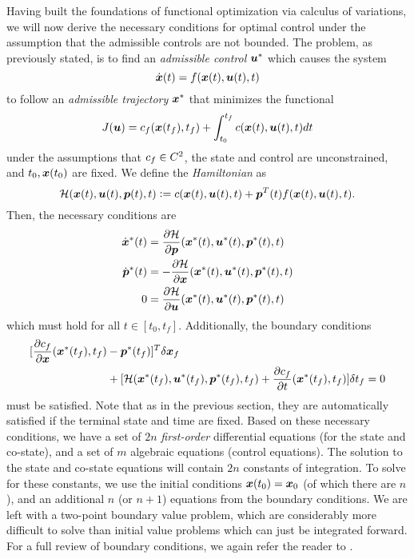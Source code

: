 Having built the foundations of functional optimization via calculus of variations, we will now derive the necessary conditions for optimal control under the assumption that the admissible controls are not bounded. The problem, as previously stated, is to find an \textit{admissible control} $\bm{u}^*$ which causes the system 
\begin{equation}
    \dot{\bm{x}}(t) = f(\bm{x}(t),\bm{u}(t),t)
\end{equation}
to follow an \textit{admissible trajectory} $\bm{x}^*$ that minimizes the functional
\begin{equation}
    J(\bm{u}) = c_f(\bm{x}(t_f),t_f) + \int_{t_0}^{t_f} c(\bm{x}(t),\bm{u}(t),t) dt
\end{equation}
under the assumptions that $c_f \in C^2$, the state and control are unconstrained, and $t_0, \bm{x}(t_0)$ are fixed. We define the \textit{Hamiltonian} as
\begin{equation}
    \mathcal{H}(\bm{x}(t),\bm{u}(t),\bm{p}(t),t) \vcentcolon= c(\bm{x}(t),\bm{u}(t),t) + \bm{p}^T(t) f(\bm{x}(t),\bm{u}(t),t).
\end{equation}
Then, the necessary conditions are 
\begin{align}
\label{eq:nec_ham_conds1}
    \dot{\bm{x}}^*(t) &= \frac{\partial \mathcal{H}}{\partial \bm{p}}(\bm{x}^*(t),\bm{u}^*(t),\bm{p}^*(t),t)\\
    \dot{\bm{p}}^*(t) &= -\frac{\partial \mathcal{H}}{\partial \bm{x}}(\bm{x}^*(t),\bm{u}^*(t),\bm{p}^*(t),t)\\
    0 &= \frac{\partial \mathcal{H}}{\partial \bm{u}}(\bm{x}^*(t),\bm{u}^*(t),\bm{p}^*(t),t)
    \label{eq:nec_ham_conds3}
\end{align}
which must hold for all $t \in [t_0,t_f]$. Additionally, the boundary conditions 
\begin{align}
\label{eq:ham_bcs}
    [\frac{\partial c_f}{\partial \bm{x}}(\bm{x}^*(t_f),t_f)& - \bm{p}^*(t_f)]^T \delta \bm{x}_f\\
    & + [ \mathcal{H}(\bm{x}^*(t_f),\bm{u}^*(t_f), \bm{p}^*(t_f), t_f) + \frac{\partial c_f}{\partial t}(\bm{x}^*(t_f),t_f)] \delta t_f = 0 \nonumber
\end{align}
must be satisfied. Note that as in the previous section, they are automatically satisfied if the terminal state and time are fixed. Based on these necessary conditions, we have a set of $2n$ \textit{first-order} differential equations (for the state and co-state), and a set of $m$ algebraic equations (control equations). The solution to the state and co-state equations will contain $2n$ constants of integration. To solve for these constants, we use the initial conditions $\bm{x}(t_0) = \bm{x}_0$ (of which there are $n$), and an additional $n$ (or $n+1$) equations from the boundary conditions. We are left with a two-point boundary value problem, which are considerably more difficult to solve than initial value problems which can just be integrated forward. For a full review of boundary conditions, we again refer the reader to \cite{kirk2012optimal}.

